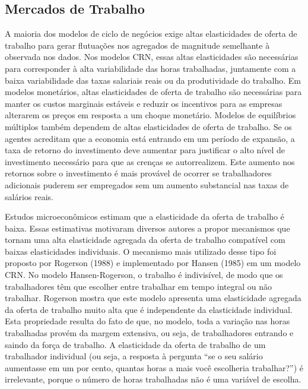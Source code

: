 \documentclass[12pt]{article}
\begin{document}
\subsection*{Mercados de Trabalho}

A maioria dos modelos de ciclo de negócios exige altas elasticidades de oferta de trabalho para gerar flutuações nos agregados de magnitude semelhante à observada nos dados. Nos modelos CRN, essas altas elasticidades são necessárias para corresponder à alta variabilidade das horas trabalhadas, juntamente com a baixa variabilidade das taxas salariais reais ou da produtividade do trabalho. Em modelos monetários, altas elasticidades de oferta de trabalho são necessárias para manter os custos marginais estáveis e reduzir os incentivos para as empresas alterarem os preços em resposta a um choque monetário. Modelos de equilíbrios múltiplos também dependem de altas elasticidades de oferta de trabalho. Se os agentes acreditam que a economia está entrando em um período de expansão, a taxa de retorno do investimento deve aumentar para justificar o alto nível de investimento necessário para que as crenças se autorrealizem. Este aumento nos retornos sobre o investimento é mais provável de ocorrer se trabalhadores adicionais puderem ser empregados sem um aumento substancial nas taxas de salários reais.

Estudos microeconômicos estimam que a elasticidade da oferta de trabalho é baixa. Essas estimativas motivaram diversos autores a propor mecanismos que tornam uma alta elasticidade agregada da oferta de trabalho compatível com baixas elasticidades individuais. O mecanismo mais utilizado desse tipo foi proposto por Rogerson (1988) e implementado por Hansen (1985) em um modelo CRN. No modelo Hansen-Rogerson, o trabalho é indivisível, de modo que os trabalhadores têm que escolher entre trabalhar em tempo integral ou não trabalhar. Rogerson mostra que este modelo apresenta uma elasticidade agregada da oferta de trabalho muito alta que é independente da elasticidade individual. Esta propriedade resulta do fato de que, no modelo, toda a variação nas horas trabalhadas provém da margem extensiva, ou seja, de trabalhadores entrando e saindo da força de trabalho. A elasticidade da oferta de trabalho de um trabalhador individual (ou seja, a resposta à pergunta “se o seu salário aumentasse em um por cento, quantas horas a mais você escolheria trabalhar?”) é irrelevante, porque o número de horas trabalhadas não é uma variável de escolha.
\end{document}
